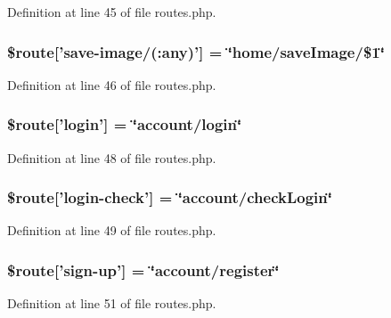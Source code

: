 Definition at line 45 of file routes.\-php.

\hypertarget{routes_8php_ada107d2f4f76b05d59584b97f4620e4e}{
\subsubsection[{\$route}]{\setlength{\rightskip}{0pt plus 5cm}\$route\mbox{[}'save-\/image/(\-:any)'\mbox{]} = \char`\"{}home/save\-Image/\$1\char`\"{}}}\label{routes_8php_ada107d2f4f76b05d59584b97f4620e4e}


Definition at line 46 of file routes.\-php.

\hypertarget{routes_8php_ae498edf30300ac629d57d6f792269b5e}{
\subsubsection[{\$route}]{\setlength{\rightskip}{0pt plus 5cm}\$route\mbox{[}'login'\mbox{]} = \char`\"{}account/login\char`\"{}}}\label{routes_8php_ae498edf30300ac629d57d6f792269b5e}


Definition at line 48 of file routes.\-php.

\hypertarget{routes_8php_a802ddf2665f072c35f9e48b2b5f7e9ce}{
\subsubsection[{\$route}]{\setlength{\rightskip}{0pt plus 5cm}\$route\mbox{[}'login-\/check'\mbox{]} = \char`\"{}account/check\-Login\char`\"{}}}\label{routes_8php_a802ddf2665f072c35f9e48b2b5f7e9ce}


Definition at line 49 of file routes.\-php.

\hypertarget{routes_8php_a1a7cba54e5f132d593cd2e73f0b4aa21}{
\subsubsection[{\$route}]{\setlength{\rightskip}{0pt plus 5cm}\$route\mbox{[}'sign-\/up'\mbox{]} = \char`\"{}account/register\char`\"{}}}\label{routes_8php_a1a7cba54e5f132d593cd2e73f0b4aa21}


Definition at line 51 of file routes.\-php.


